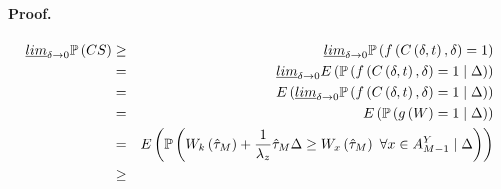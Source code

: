\documentclass[12pt,english]{article}
\begin{document}
\paragraph*{Proof.}

\begin{eqnarray*}
\underline{lim}_{\delta\rightarrow0}\mathbb{P}\left(CS\right) & \geq & \underline{lim}_{\delta\rightarrow0}\mathbb{P}\left(f\left(C\left(\delta,t\right),\delta\right)=1\right)\\
 & = & \underline{lim}_{\delta\rightarrow0}E\left(\mathbb{P}\left(f\left(C\left(\delta,t\right),\delta\right)=1\mid\Delta\right)\right)\\
 & = & E\left(\underline{lim}_{\delta\rightarrow0}\mathbb{P}\left(f\left(C\left(\delta,t\right),\delta\right)=1\mid\Delta\right)\right)\\
 & = & E\left(\mathbb{P}\left(g\left(W\right)=1\mid\Delta\right)\right)\\
 & = & E\left(\mathbb{P}\left(W_{k}\left(\hat{\tau}_{M}\right)+\frac{1}{\lambda_{z}}\hat{\tau}_{M}\Delta\geq W_{x}\left(\hat{\tau}_{M}\right)\mbox{ }\forall x\in A_{M-1}^{Y}\mid\text{\ensuremath{\Delta}}\right)\right)\\
 & \geq
\end{eqnarray*}
\end{document}
